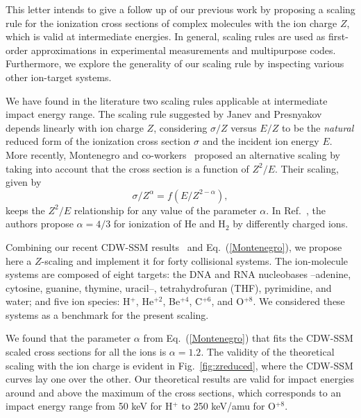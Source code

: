 \documentclass[10pt,showpacs,showkeys,twocolumn]{revtex4-1}
\begin{document}
This letter intends to give a follow up of our previous work by 
proposing a scaling rule for the ionization cross sections of complex 
molecules with the ion charge $Z$, which is valid at intermediate 
energies. In general, scaling rules are used as first-order 
approximations in experimental measurements and multipurpose codes. 
Furthermore, we explore the generality of our scaling rule by inspecting 
various other ion-target systems.

We have found in the literature two scaling rules applicable at 
intermediate impact energy range. The scaling rule suggested by Janev 
and Presnyakov~\cite{janev1980} depends linearly with ion charge $Z$,
considering $\sigma/Z$ versus $E/Z$ to be the \textit{natural} reduced 
form of the ionization cross section $\sigma$ and the incident ion 
energy $E$. More recently, Montenegro and co-workers~\cite{dubois13,
montenegro_pra13} proposed an alternative scaling by taking into account 
that the cross section is a function of $Z^2/E$. Their scaling, given by 
\begin{equation}
    \sigma/Z^{\alpha}=f(E/Z^{2-\alpha}),
    \label{Montenegro}
\end{equation}
keeps the $Z^2/E$ relationship for any value of the parameter $\alpha$. 
In Ref.~\cite{dubois13}, the authors propose $\alpha=4/3$ for ionization 
of He and H$_2$ by differently charged ions. 

Combining our recent CDW-SSM results~\cite{MendezJPB20} and 
Eq.~(\ref{Montenegro}), we propose here a $Z$-scaling and implement it 
for forty collisional systems. The ion-molecule systems are composed of 
eight targets: the DNA and RNA nucleobases --adenine, cytosine, guanine, 
thymine, uracil--, tetrahydrofuran (THF), pyrimidine, and water; and 
five ion species: H$^+$, He$^{+2}$, Be$^{+4}$, C$^{+6}$, and O$^{+8}$. 
We considered these systems as a benchmark for the present scaling. 

We found that the parameter $\alpha$ from Eq.~(\ref{Montenegro}) that 
fits the CDW-SSM scaled cross sections for all the ions is $\alpha=1.2$. 
The validity of the theoretical scaling with the ion charge is evident
in Fig.~\ref{fig:zreduced}, where the CDW-SSM curves lay one over the 
other. Our theoretical results are valid for impact energies around and 
above the maximum of the cross sections, which corresponds to an impact
energy range from 50 keV for H$^+$ to 250 keV/amu for O$^{+8}$. 
\end{document}
